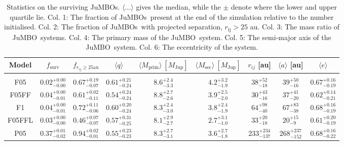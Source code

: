 \documentclass[aa]{lib/aa}
\newcommand{\jumbo}{\mbox{JuMBO}}
\newcommand{\jumbos}{\mbox{JuMBOs}}
\begin{document}
    \begin{table}
         \caption{Statistics on the surviving JuMBOs. $\langle ...\rangle$ gives the median, while the $\pm$ denote where the lower and upper quartile lie. Col. 1: The fraction of \jumbos\, present at the end of the simulation relative to the number initialised. Col. 2: The fraction of \jumbos\, with projected separation, $r_{\mathrm{ij}} > 25$ au. Col. 3: The mass ratio of \jumbo\, systems. Col. 4: The primary mass of the \jumbo\, system. Col. 5: The semi-major axis of the \jumbo\, system. Col. 6: The eccentricity of the system.}
        \label{Tab:SF_Res}
        \centering 
        \begin{tabular}{c c c c c c c c c}
        \hline\hline
        Model & $f_{\mathrm{surv}}$ & $f_{r_{ij} \geq 25\mathrm{ au}}$ & $\langle q\rangle$ & $\langle M_{\mathrm{prim}} \rangle\ [M_{\mathrm{Jup}}]$ & $\langle M_{\mathrm{sec}} \rangle\ [M_{\mathrm{Jup}}]$ & $r_{ij}$ [au] &$\langle a \rangle$ [au] & $\langle e \rangle$\\
        \hline \vspace{-0.75em}\\ 
           F05     & $0.02^{+0.00}_{-0.00}$ & $0.67^{+0.19}_{-0.07}$ & $0.61^{+0.21}_{-0.24}$ & $8.6^{+2.4}_{-3.3}$ & $4.2^{+3.2}_{-1.9}$ & $38^{+52}_{-18}$ & $39^{+50}_{-16}$ & $0.67^{+0.16}_{-0.19}$ \vspace{0.25em}\\
           F05FF   & $0.04^{+0.00}_{-0.01}$ & $0.61^{+0.02}_{-0.11}$ & $0.54^{+0.24}_{-0.24}$ & $8.8^{+2.7}_{-2.6}$ & $3.9^{+2.5}_{-2.0}$ & $30^{+43}_{-16}$ & $37^{+41}_{-20}$ & $0.62^{+0.14}_{-0.21}$ \vspace{0.25em}\\
           F1      & $0.04^{+0.00}_{-0.01}$ & $0.72^{+0.11}_{-0.06}$ & $0.60^{+0.20}_{-0.24}$ & $8.3^{+2.4}_{-3.0}$ & $3.8^{+2.4}_{-1.9}$ & $64^{+98}_{-40}$ & $67^{+83}_{-38}$ & $0.68^{+0.16}_{-0.19}$ \vspace{0.25em}\\
           F05FFL  & $0.03^{+0.00}_{-0.00}$ & $0.46^{+0.07}_{-0.07}$ & $0.57^{+0.31}_{-0.25}$ & $8.1^{+2.9}_{-2.7}$ & $2.7^{+3.1}_{-1.0}$ & $33^{+20}_{-18}$ & $20^{+15}_{-9}$ & $0.61^{+0.20}_{-0.19}$ \vspace{0.25em}\\
           P05     & $0.37^{+0.01}_{-0.02}$ & $0.94^{+0.02}_{-0.01}$ & $0.55^{+0.23}_{-0.23}$ & $8.3^{+2.7}_{-3.1}$ & $3.6^{+2.7}_{-1.8}$ & $233^{+234}_{-137}$ & $268^{+237}_{-152}$ & $0.68^{+0.16}_{-0.22}$ \vspace{0.25em}\\

\end{tabular}
\end{table}
\end{document}
